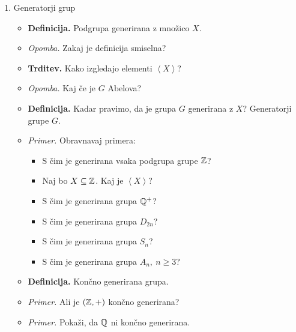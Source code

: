 \begin{enumerate}
    \item Generatorji grup
    \begin{itemize}
        \item \colorbox{purple!30}{\textbf{Definicija.}} Podgrupa generirana z množico $X$.        
        \item \colorbox{yellow!30}{\emph{Opomba.}} Zakaj je definicija smiselna?
        \item \colorbox{blue!30}{\textbf{Trditev.}} Kako izgledajo elementi $\left\langle X \right\rangle$?   
        \item \colorbox{yellow!30}{\emph{Opomba.}} Kaj če je $G$ Abelova?
        \item \colorbox{purple!30}{\textbf{Definicija.}} Kadar pravimo, da je grupa $G$ generirana z $X$? Generatorji grupe $G$.   
        \item \colorbox{yellow!30}{\emph{Primer.}} Obravnavaj primera:
        \begin{itemize}
            \item S čim je generirana vsaka podgrupa grupe $\mathbb{Z}$?
            \item Naj bo $X \subseteq \mathbb{Z}$. Kaj je $\left\langle X \right\rangle $?
            \item S čim je generirana grupa $\mathbb{Q}^+$?
            \item S čim je generirana grupa $D_{2n}$?
            \item S čim je generirana grupa $S_n$?
            \item S čim je generirana grupa $A_n, \ n \geq 3$?
        \end{itemize}
        \item \colorbox{purple!30}{\textbf{Definicija.}} Končno generirana grupa.      
        \item \colorbox{yellow!30}{\emph{Primer.}} Ali je $(\mathbb{Z}, +)$ končno generirana?        
        \item \colorbox{yellow!30}{\emph{Primer.}} Pokaži, da $\mathbb{Q}$ ni končno generirana.
    \end{itemize}
\end{enumerate}